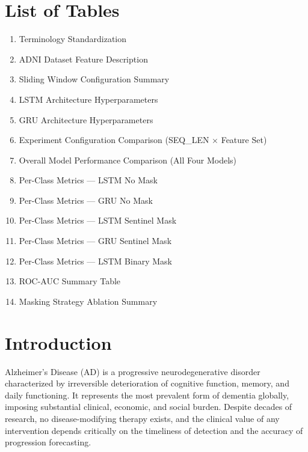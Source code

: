 \documentclass[12pt,singleside,a4paper]{article}
\begin{document}
\section*{List of Tables}
\begin{enumerate}
    \item Terminology Standardization
    \item ADNI Dataset Feature Description
    \item Sliding Window Configuration Summary
    \item LSTM Architecture Hyperparameters
    \item GRU Architecture Hyperparameters
    \item Experiment Configuration Comparison (SEQ\_LEN $\times$ Feature Set)
    \item Overall Model Performance Comparison (All Four Models)
    \item Per-Class Metrics — LSTM No Mask
    \item Per-Class Metrics — GRU No Mask
    \item Per-Class Metrics — LSTM Sentinel Mask
    \item Per-Class Metrics — GRU Sentinel Mask
    \item Per-Class Metrics — LSTM Binary Mask
    \item ROC-AUC Summary Table
    \item Masking Strategy Ablation Summary
\end{enumerate}

\pagebreak
\tableofcontents

\pagebreak
\section{Introduction}

Alzheimer's Disease (AD) is a progressive neurodegenerative disorder characterized by irreversible deterioration of cognitive function, memory, and daily functioning. It represents the most prevalent form of dementia globally, imposing substantial clinical, economic, and social burden. Despite decades of research, no disease-modifying therapy exists, and the clinical value of any intervention depends critically on the timeliness of detection and the accuracy of progression forecasting.
\end{document}
